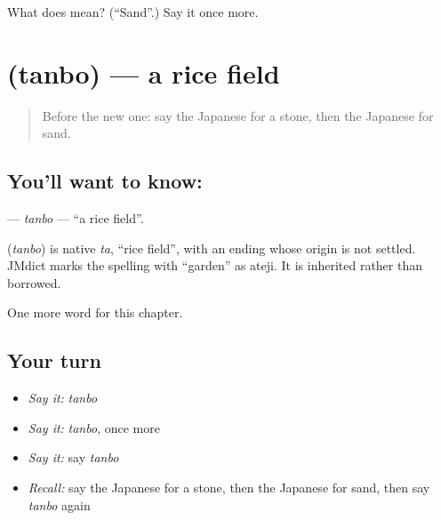 \begin{tcolorbox}[breakable,colback=teal!4,colframe=teal!35!black,title={Before you move on}]
What does  mean? (\textquotedblleft{}Sand\textquotedblright{}.) Say it once more.
\end{tcolorbox}
\section[\texorpdfstring{\ja{たんぼ} (tanbo)}{たんぼ (tanbo)}]{ (tanbo) — a rice field}

\label{lesson:JA-C43-tanbo}



\begin{quote}
Before the new one: say the Japanese for a stone, then the Japanese for sand.
\end{quote}

\subsection*{You'll want to know: }
\textbf{} — \emph{tanbo} — \textquotedblleft{}a rice field\textquotedblright{}.

\begin{cousinweb}
\textbf{} (\emph{tanbo}) is native \emph{ta}, \textquotedblleft{}rice field\textquotedblright{}, with an ending whose origin is not settled. JMdict marks the spelling with \textquotedblleft{}garden\textquotedblright{} as ateji. It is inherited rather than borrowed.
\end{cousinweb}

\begin{grammarlens}[title={What you've built}]
One more word for this chapter.
\end{grammarlens}

\subsection*{Your turn}
\begin{itemize}
\raggedright
  \item \emph{Say it:} \emph{tanbo}
  \item \emph{Say it:} \emph{tanbo}, once more
  \item \emph{Say it:} say \emph{tanbo}
  \item \emph{Recall:} say the Japanese for a stone, then the Japanese for sand, then say \emph{tanbo} again
\end{itemize}

